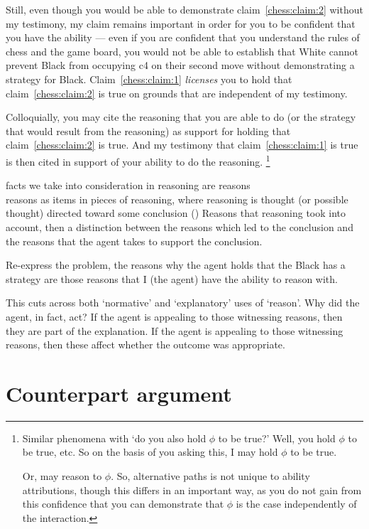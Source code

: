\documentclass[10pt]{article}
\newcommand{\hozlinedash}[0]{%
  \noindent\hdashrule[0.5ex][c]{\textwidth}{.1pt}{2.5pt}
}
\begin{document}
Still, even though you would be able to demonstrate claim~\ref{chess:claim:2} without my testimony, my claim remains important in order for you to be confident that you have the ability --- even if you are confident that you understand the rules of chess and the game board, you would not be able to establish that White cannot prevent Black from occupying c4 on their second move without demonstrating a strategy for Black.
Claim~\ref{chess:claim:1} \emph{licenses} you to hold that claim~\ref{chess:claim:2} is true on grounds that are independent of my testimony.

Colloquially, you may cite the reasoning that you are able to do (or the strategy that would result from the reasoning) as support for holding that claim~\ref{chess:claim:2} is true.
And my testimony that claim~\ref{chess:claim:1} is true is then cited in support of your ability to do the reasoning.\nolinebreak
\footnote{
  Similar phenomena with `do you also hold \(\phi\) to be true?'
  Well, you hold \(\phi\) to be true, etc.
  So on the basis of you asking this, I may hold \(\phi\) to be true.

  Or, may reason to \(\phi\).
  So, alternative paths is not unique to ability attributions, though this differs in an important way, as you do not gain from this confidence that you can demonstrate that \(\phi\) is the case independently of the interaction.
}

{
  \color{red}
  facts we take into consideration in reasoning are reasons \\
  reasons as items in pieces of reasoning, where reasoning is thought (or possible thought) directed toward some conclusion (\citeyear[421]{Hieronymi:2011aa})
}
Reasons that reasoning took into account, then a distinction between the reasons which led to the conclusion and the reasons that the agent takes to support the conclusion.


Re-express the problem, the reasons why the agent holds that the Black has a strategy are those reasons that I (the agent) have the ability to reason with.

This cuts across both `normative' and `explanatory' uses of `reason'.
Why did the agent, in fact, act?
If the agent is appealing to those witnessing reasons, then they are part of the explanation.
If the agent is appealing to those witnessing reasons, then these affect whether the outcome was appropriate.

\hozlinedash



\section{Counterpart argument}
\label{sec:counterpart-argument}
\end{document}
